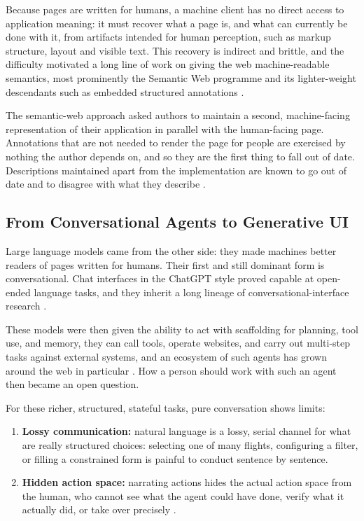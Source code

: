 Because pages are written for humans, a machine client has no direct access to application meaning: it must recover what a page is, and what can currently be done with it, from artifacts intended for human perception, such as markup structure, layout and visible text.
This recovery is indirect and brittle, and the difficulty motivated a long line of work on giving the web machine-readable semantics, most prominently the Semantic Web programme and its lighter-weight descendants such as embedded structured annotations \cite{berners-lee2001semantic, guha2016schemaorg}.

The semantic-web approach asked authors to maintain a second, machine-facing representation of their application in parallel with the human-facing page.
Annotations that are not needed to render the page for people are exercised by nothing the author depends on, and so they are the first thing to fall out of date.
Descriptions maintained apart from the implementation are known to go out of date and to disagree with what they describe \cite{uddin2015how, mastouri2026rest}.

\subsection{From Conversational Agents to Generative UI}\label{sec:bg:genui}

Large language models came from the other side: they made machines better readers of pages written for humans.
Their first and still dominant form is conversational.
Chat interfaces in the ChatGPT style proved capable at open-ended language tasks, and they inherit a long lineage of conversational-interface research \cite{mctear2017rise}.

These models were then given the ability to act with scaffolding for planning, tool use, and memory, they can call tools, operate websites, and carry out multi-step tasks against external systems, and an ecosystem of such agents has grown around the web in particular \cite{yang2025agentic, ning2025survey, zhou2024webarena, gur2023realworld, song2025browsing}.
How a person should work with such an agent then became an open question.

For these richer, structured, stateful tasks, pure conversation shows limits:
\begin{enumerate}
    \item \textbf{Lossy communication:} natural language is a lossy, serial channel for what are really structured choices: selecting one of many flights, configuring a filter, or filling a constrained form is painful to conduct sentence by sentence.
    \item \textbf{Hidden action space:} narrating actions hides the actual action space from the human, who cannot see what the agent could have done, verify what it actually did, or take over precisely \cite{zhang2025exploring}.
\end{enumerate}

